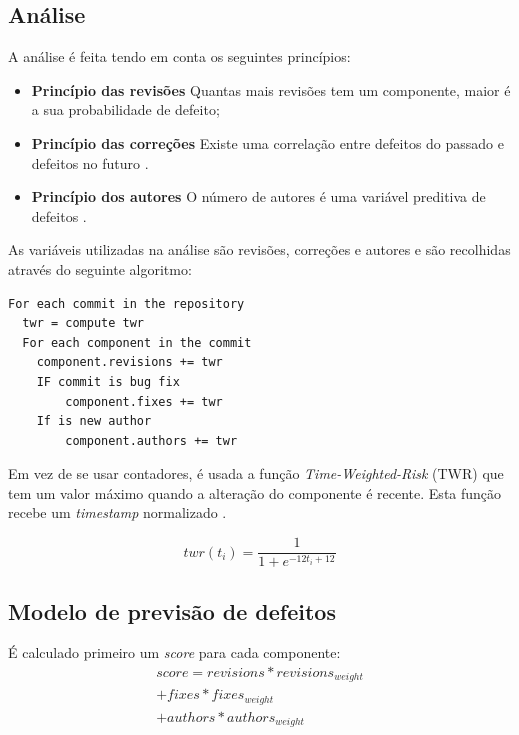 \documentclass[9pt,a4paper]{extarticle}
\begin{document}
\begin{multicols}{2}
\subsection{Análise}
A análise é feita tendo em conta os seguintes princípios:

\begin{itemize}
\item \textbf{Princípio das revisões} Quantas mais revisões tem um componente,
maior é a sua probabilidade de defeito\cite{859533};

\item \textbf{Princípio das correções} Existe uma correlação entre defeitos do
passado e defeitos no futuro \cite{Zimmermann:2007:PDE:1268984.1269057}.

\item \textbf{Princípio dos autores} O número de autores é uma variável
preditiva de defeitos \cite{Moser:2008:CAE:1368088.1368114,D'Ambros:2012:EDP:2318097.2318149}.
\end{itemize}


As variáveis utilizadas na análise são revisões, correções e autores e são
recolhidas através do seguinte algoritmo:

\begin{verbatim}
For each commit in the repository
  twr = compute twr
  For each component in the commit
    component.revisions += twr
    IF commit is bug fix
        component.fixes += twr
    If is new author
        component.authors += twr
\end{verbatim}

Em vez de se usar contadores, é usada a função \emph{Time-Weighted-Risk} (TWR) que
tem um valor máximo quando a alteração do componente é recente. Esta função
recebe um \emph{timestamp} normalizado \cite{Chris2013}.

\begin{equation}
twr(t_i) = \frac{1}{1 + e^{-12t_i + 12 }}
\end{equation}

\subsection{Modelo de previsão de defeitos}
É calculado primeiro um \emph{score} para cada componente:
\begin{equation}
\begin{multlined}score = revisions * revisions_{weight} \\
+ fixes * fixes_{weight} \\
+ authors * authors_{weight} \\
\end{multlined}
\end{equation}


\end{multicols}
\end{document}
